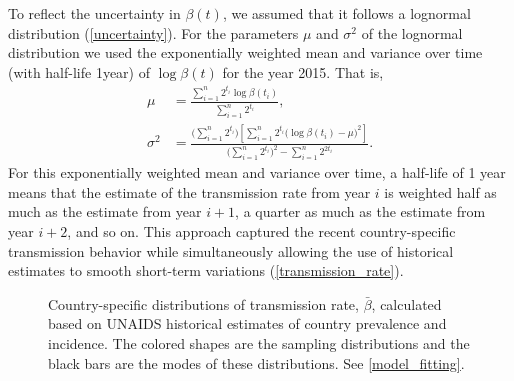 \documentclass{article}
\begin{document}
To reflect the uncertainty in $\beta(t)$, we assumed that it follows a
lognormal distribution (\autoref{uncertainty}). For the parameters
$\mu$ and $\sigma^2$ of the lognormal distribution we used the
exponentially weighted mean and variance \cite{holt2004} over time
(with half-life 1\;year) of $\log \beta(t)$ for the year 2015.  That
is,
\begin{equation}
  \label{lognormal_params}
  \begin{split}
    \mu &= \frac{\sum_{i = 1}^n  2^{t_i}
      \log \beta(t_i)}
    {\sum_{i = 1}^n 2^{t_i}},
    \\
    \sigma^2 &= \frac{\big(\sum_{i = 1}^n 2^{t_i}\big)
      \left[\sum_{i = 1}^n  2^{t_i}
        \big(\log \beta(t_i) - \mu\big)^2\right]}
    {\big(\sum_{i = 1}^n 2^{t_i}\big)^2
      - \sum_{i = 1}^n 2^{2 t_i}}.
  \end{split}
\end{equation}
For this exponentially weighted mean and variance over time, a
half-life of 1 year means that the estimate of the transmission rate
from year $i$ is weighted half as much as the estimate from year
$i + 1$, a quarter as much as the estimate from year $i + 2$, and so
on.  This approach captured the recent country-specific transmission
behavior while simultaneously allowing the use of historical estimates
to smooth short-term variations (\autoref{transmission_rate}).

\begin{figure}
  \begin{center}
    
  \end{center}
  \caption{Country-specific distributions of transmission rate,
    $\bar{\beta}$, calculated based on UNAIDS historical estimates of
    country prevalence and incidence.  The colored shapes are the
    sampling distributions and the black bars are the modes of these
    distributions.  See \autoref{model_fitting}.}
  \label{transmission_rate}
\end{figure}
\end{document}
